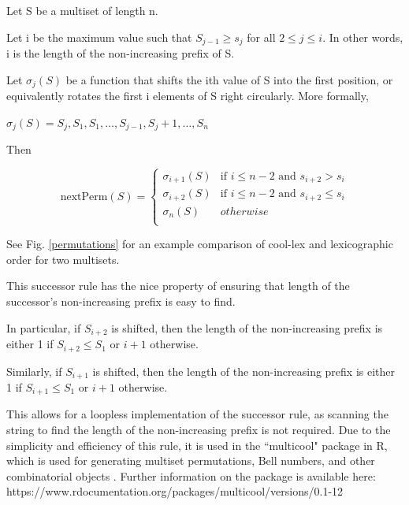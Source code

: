 \noindent Let S be a multiset of length n.

\noindent Let i be the maximum value such that $S_{j-1} \ge s_j$ for all $2 \le j \le i$.  In other words, i is the length of the non-increasing prefix of S.  

\noindent Let $\sigma_j(S)$ be a function that shifts the ith value of S into the first position, or equivalently rotates the first i elements of S right circularly.  More formally, 

\noindent $\sigma_j(S)=S_j,S_1,S_1,\dots,S_{j-1},S_j+1,\dots,S_n $

Then

\begin{equation*}
    \text{nextPerm}(S) = \begin{cases}
	\sigma_{i+1}(S) & \text{if $i \le n-2$ and $s_{i+2} > s_i$}\\
	\sigma_{i+2}(S) & \text{if $i \le n-2$ and $s_{i+2} \le s_i$}\\
	\sigma_{n}(S) & otherwise\\
\end{cases}
\end{equation*}


See Fig. \ref{permutations} for an example comparison of cool-lex and lexicographic order for two multisets.

This successor rule has the nice property of ensuring that length of the successor's non-increasing prefix is easy to find.

In particular, if $S_{i+2}$ is shifted, then the length of the non-increasing prefix is either 1 if $S_{i+2}\le S_1$ or $i+1$ otherwise. 

Similarly, if $S_{i+1}$ is shifted, then the length of the non-increasing prefix is either 1 if $S_{i+1}\le S_1$ or $i+1$ otherwise. 

This allows for a loopless implementation of the successor rule, as scanning the string to find the length of the non-increasing prefix is not required.  Due to the simplicity and efficiency of this rule, it is used in the ``multicool" package in R, which is used for generating multiset permutations, Bell numbers, and other combinatorial objects \cite{multicool_2021}.   Further information on the package is available here: https://www.rdocumentation.org/packages/multicool/versions/0.1-12


